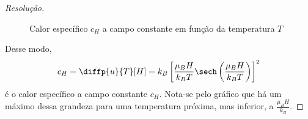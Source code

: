 \begin{proof}[Resolução]
    \begin{figure}[!h]
            \centering
            \caption{Calor específico \(c_H\) a campo constante em função da temperatura \(T\)}
        \end{figure}
    Desse modo,
    \begin{equation*}
        c_H = \diffp{u}{T}[H] = k_B\left[\frac{\mu_B H}{k_BT}\sech\left(\frac{\mu_B H}{k_BT}\right)\right]^2
    \end{equation*}
    é o calor específico a campo constante \(c_H\). Nota-se pelo gráfico que há um máximo dessa grandeza para uma temperatura próxima, mas inferior, a \(\frac{\mu_BH}{k_B}\).
\end{proof}
